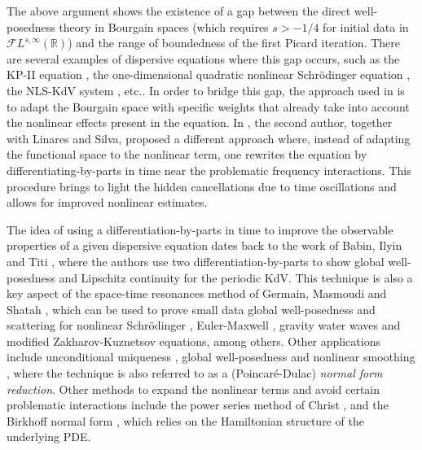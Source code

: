 \documentclass[%
11pt,  reqno]{amsart}
\newcommand{\5}{\textup{V}}
\theoremstyle{remark}
\newcommand{\R}{\mathbb{R}}
\numberwithin{equation}{section}
\numberwithin{theorem}{section}
\begin{document}
	\medskip
	The above argument shows the existence of a gap between the direct well-posedness theory in Bourgain spaces (which   requires $s>-1/4$ for initial data in $\mathcal{F}L^{s,\infty}(\R)$) and the range of boundedness of the first Picard iteration. There are several examples of dispersive equations where this gap occurs, such as the KP-II equation \cite{hadac, HHK_kpii}, the one-dimensional quadratic nonlinear Schrödinger equation \cite{taobejenaru, OS12}, the NLS-KdV system \cite{CLS}, etc.. In order to bridge this gap, the approach used in \cite{ taobejenaru, hadac, HHK_kpii} is to adapt the Bourgain space with specific weights that already take into account the nonlinear effects present in the equation. In \cite{CLS}, the second author, together with Linares and Silva, proposed a different approach where, instead of adapting the functional space to the nonlinear term, one rewrites the equation by differentiating-by-parts in time near the problematic frequency interactions. This procedure brings to light the hidden cancellations due to time oscillations and allows for improved nonlinear estimates. 

    \smallskip
	The idea of using a differentiation-by-parts in time to improve the observable properties of a given dispersive equation dates back to the work of Babin, Ilyin and Titi \cite{bit}, where the authors use two differentiation-by-parts to show global well-posedness and Lipschitz continuity for the periodic KdV. This technique is also a key aspect of the space-time resonances method of Germain, Masmoudi and Shatah \cite{GMS_nls_3d}, which can be used to prove small data global well-posedness and scattering for nonlinear Schrödinger \cite{katopusateri}, Euler-Maxwell \cite{GermainMasmoudi_euler_maxwell}, gravity water waves \cite{GMS_gravity} and modified Zakharov-Kuznetsov \cite{anjolras} equations, among others. Other applications include unconditional uniqueness \cite{kishimoto, KwonOh_uu_mkdv, KOY20}, global well-posedness \cite{CGKO_normal_form, IfrimTataru} and nonlinear smoothing \cite{ CS20,  ErdoganTzirakis_nls, ErdoganTzirakis_kdv, McConnel_nls}, where the technique is also referred to as a (Poincaré-Dulac) \emph{normal form reduction}. Other methods to expand the nonlinear terms and avoid certain problematic interactions include the power series method of Christ \cite{Christ_power}, and the Birkhoff normal form \cite{Bambusi_birkhoff, bourg_birkhoff_normal, CollianderKwonOh_birkhoff}, which relies on the Hamiltonian structure of the underlying PDE.
\end{document}
